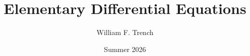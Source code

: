 



\title{%
\iftoggle{solutionManual}{Student Solutions Manual For }{}%
Elementary Differential Equations%
\iftoggle{boundaryvalues}{ With Boundary Value Problems}{}%
}

\author{William F. Trench}
\date{Summer 2026}
